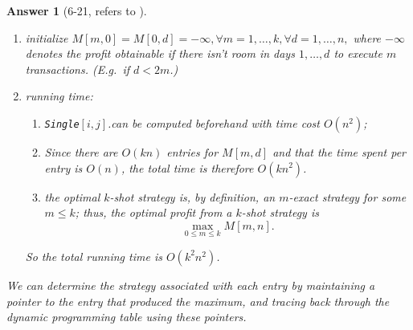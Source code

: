 \documentclass[11pt]{article}
\theoremstyle{numberplain}
\theoremstyle{nonumberplain}
\newtheorem{ans}{Answer}
\newcommand{\0}{{\mathbf{0}}}
\begin{document}
\begin{ans}[6-21, refers to \cite{solcornell}]
\begin{enumerate}
\item initialize $M[m,0] = M[0,d] = -\infty,\forall m=1,\ldots,k,\forall d=1,\ldots,n,$
 where $-\infty$ denotes the profit obtainable
if there isn't room in days $1, \ldots, d$ to execute
$m$ transactions.  (E.g.~if $d < 2m$.)
\\
\item running time:
\begin{enumerate}
\item {\tt Single}$[i,j]$.can be computed beforehand with time cost $O(n^2)$;
\item 
Since there are $O(kn)$ entries for $M[m,d]$ and that the time spent per entry is $O(n)$, the total time is therefore $O(kn^2)$.
\item the optimal $k$-shot strategy is, by definition,
an $m$-exact strategy for some $m \leq k$;
thus, the optimal profit from a $k$-shot strategy is
$$\max_{0 \leq m \leq k} M[m,n].$$
\end{enumerate}
So the total running time is $O(k^2n^2)$.
\end{enumerate}
We can determine the strategy associated with
each entry by maintaining a pointer to the entry 
that produced the maximum, and tracing back through
the dynamic programming table using these pointers.
\end{ans}
\end{document}
